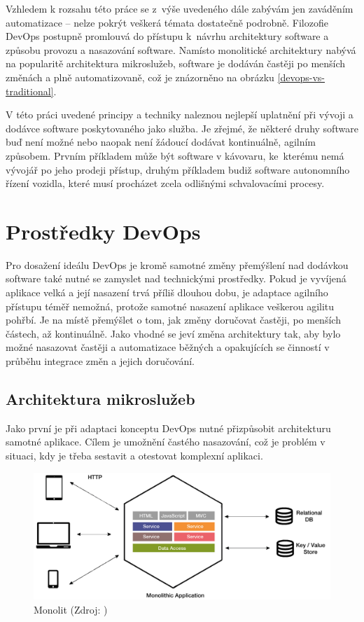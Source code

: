 \documentclass[FM,DP]{tulthesis}
\begin{document}
Vzhledem k rozsahu této práce se z~výše uvedeného dále zabývám jen zaváděním automatizace -- nelze pokrýt veškerá 
témata dostatečně 
podrobně. Filozofie DevOps postupně promlouvá do přístupu k~návrhu architektury software a způsobu provozu a
nasazování software. Namísto monolitické architektury nabývá na popularitě architektura mikroslužeb, software
je dodáván častěji po menších změnách a plně automatizovaně, což je znázorněno na obrázku \ref{devops-vs-traditional}.

V této práci uvedené principy a techniky naleznou nejlepší uplatnění při vývoji a dodávce software poskytovaného
jako služba. Je zřejmé, že některé druhy software buď není možné nebo naopak není žádoucí dodávat kontinuálně,
agilním způsobem. Prvním příkladem může být software v kávovaru, ke~kterému nemá vývojář po jeho prodeji přístup, 
druhým příkladem budiž software autonomního řízení vozidla, které musí procházet zcela odlišnými schvalovacími
procesy.

\chapter{Prostředky DevOps}

Pro dosažení ideálu DevOps je kromě samotné změny přemýšlení nad dodávkou software také nutné se zamyslet
nad technickými prostředky. Pokud je vyvíjená aplikace velká a její nasazení trvá příliš dlouhou dobu, 
je adaptace agilního přístupu téměř nemožná, protože samotné nasazení aplikace veškerou agilitu pohřbí.
Je na místě přemýšlet o tom, jak změny doručovat častěji, po menších částech, až kontinuálně. Jako vhodné
se jeví změna architektury tak, aby bylo možné nasazovat častěji a automatizace běžných a opakujících se
činností v průběhu integrace změn a jejich doručování.

\section{Architektura mikroslužeb}

Jako první je při adaptaci konceptu DevOps nutné přizpůsobit architekturu samotné aplikace. Cílem
je umožnění častého nasazování, což je problém v situaci, kdy je třeba sestavit a otestovat komplexní
aplikaci.

\begin{figure}[h]
\center
\includegraphics[width=\textwidth]{monolith.png}
\caption{Monolit (Zdroj: \cite{monolith})}
\label{monolith}
\end{figure}
\end{document}
